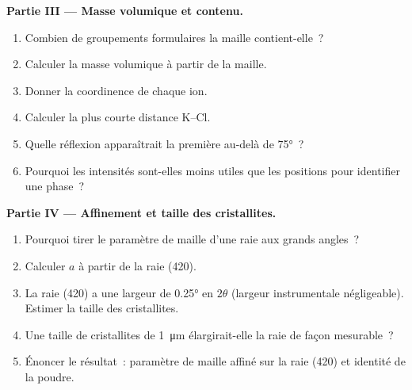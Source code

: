 \begin{problem}
\medskip\noindent\textbf{Partie III --- Masse volumique et contenu.}
\begin{enumerate}[resume]
  \item Combien de groupements formulaires la maille contient-elle~?
  \item Calculer la masse volumique à partir de la maille.
  \item Donner la coordinence de chaque ion.
  \item Calculer la plus courte distance K--Cl.
  \item Quelle réflexion apparaîtrait la première au-delà de \ang{75}~?
  \item Pourquoi les intensités sont-elles moins utiles que les positions
        pour identifier une phase~?
\end{enumerate}

\medskip\noindent\textbf{Partie IV --- Affinement et taille des cristallites.}
\begin{enumerate}[resume]
  \item Pourquoi tirer le paramètre de maille d'une raie aux grands
        angles~?
  \item Calculer $a$ à partir de la raie (420).
  \item La raie (420) a une largeur de \ang{0.25} en $2\theta$ (largeur
        instrumentale négligeable). Estimer la taille des cristallites.
  \item Une taille de cristallites de \qty{1}{\micro m} élargirait-elle la
        raie de façon mesurable~?
  \item Énoncer le résultat~: paramètre de maille affiné sur la raie
        (420) et identité de la poudre.
\end{enumerate}
\end{problem}
